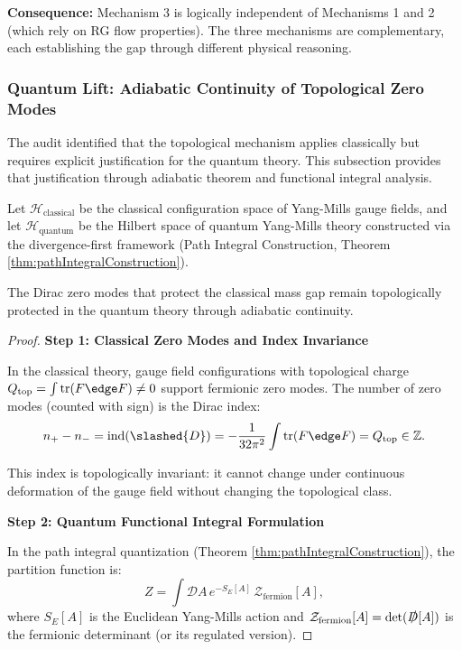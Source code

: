 \noindent\textbf{Consequence:} Mechanism 3 is logically independent of Mechanisms 1 and 2 (which rely on RG flow properties). The three mechanisms are complementary, each establishing the gap through different physical reasoning.

\subsubsection{Quantum Lift: Adiabatic Continuity of Topological Zero Modes}

The audit identified that the topological mechanism applies classically but requires explicit justification for the quantum theory. This subsection provides that justification through adiabatic theorem and functional integral analysis.

\begin{theorem}
\label{thm:quantumLiftTopologicalProtection}

Let $\mathcal{H}_{\text{classical}}$ be the classical configuration space of Yang-Mills gauge fields, and let $\mathcal{H}_{\text{quantum}}$ be the Hilbert space of quantum Yang-Mills theory constructed via the divergence-first framework (Path Integral Construction, Theorem \ref{thm:pathIntegralConstruction}).

The Dirac zero modes that protect the classical mass gap remain topologically protected in the quantum theory through adiabatic continuity.

\begin{proof}

\textbf{Step 1: Classical Zero Modes and Index Invariance}

In the classical theory, gauge field configurations with topological charge $Q_{\text{top}} = \int \mathrm{tr}(F \edge F) \neq 0$ support fermionic zero modes. The number of zero modes (counted with sign) is the Dirac index:
\begin{equation}
n_+ - n_- = \text{ind}(\slashed{D}) = -\frac{1}{32\pi^2} \int \mathrm{tr}(F \edge F) = Q_{\text{top}} \in \mathbb{Z}.
\end{equation}

This index is topologically invariant: it cannot change under continuous deformation of the gauge field without changing the topological class.

\textbf{Step 2: Quantum Functional Integral Formulation}

In the path integral quantization (Theorem \ref{thm:pathIntegralConstruction}), the partition function is:
\begin{equation}
Z = \int \mathcal{D}A \, e^{-S_E[A]} \, \mathcal{Z}_{\text{fermion}}[A],
\end{equation}
where $S_E[A]$ is the Euclidean Yang-Mills action and $\mathcal{Z}_{\text{fermion}}[A] = \det(\slashed{D}[A])$ is the fermionic determinant (or its regulated version).


\end{proof}
\end{theorem}

